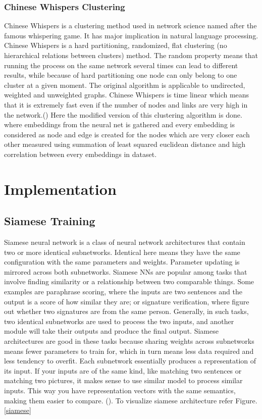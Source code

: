 \documentclass[a4paper,12pt, twoside]{NITKReport}
\begin{document}
\subsection{Chinese Whispers Clustering}
\par Chinese Whispers is a clustering method used in network science named after the famous whispering game. It has major implication in natural language processing. Chinese Whispers is a hard partitioning, randomized, flat clustering (no hierarchical relations between clusters) method. The random property means that running the process on the same network several times can lead to different results, while because of hard partitioning one node can only belong to one cluster at a given moment. The original algorithm is applicable to undirected, weighted and unweighted graphs. Chinese Whispers is time linear which means that it is extremely fast even if the number of nodes and links are very high in the network.(\cite{biemann2006chinese}) Here the modified version of this clustering algorithm is done. where embeddings from the neural net is gathered and every embedding is considered as node and edge is created for the nodes which are very closer each other measured using summation of least squared euclidean distance and high correlation between every embeddings in dataset.

\newpage
\chapter{Implementation}
\label{chap4}
\section{Siamese Training}
\par Siamese neural network is a class of neural network architectures that contain two or more identical subnetworks. Identical here means they have the same configuration with the same parameters and weights. Parameter updating is mirrored across both subnetworks. Siamese NNs are popular among tasks that involve finding similarity or a relationship between two comparable things. Some examples are paraphrase scoring, where the inputs are two sentences and the output is a score of how similar they are; or signature verification, where figure out whether two signatures are from the same person. Generally, in such tasks, two identical subnetworks are used to process the two inputs, and another module will take their outputs and produce the final output. Siamese architectures are good in these tasks because sharing weights across subnetworks means fewer parameters to train for, which in turn means less data required and less tendency to overfit. Each subnetwork essentially produces a representation of its input. If your inputs are of the same kind, like matching two sentences or matching two pictures, it makes sense to use similar model to process similar inputs. This way you have representation vectors with the same semantics, making them easier to compare. (\cite{bromley1993reputation}). To visualize siamese architecture refer Figure.\ref{siamese}
\end{document}
